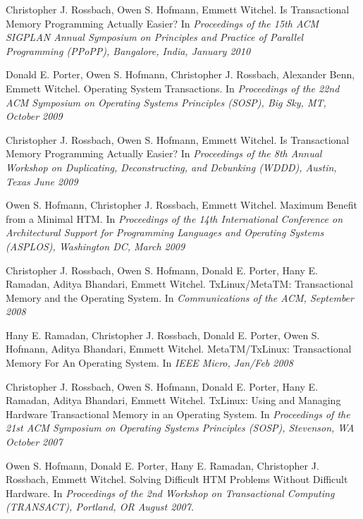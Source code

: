 \begin{bibsection}
\item Christopher J. Rossbach, Owen S. Hofmann, Emmett Witchel.
Is Transactional Memory Programming Actually Easier?
In \emph{Proceedings of the  15th ACM SIGPLAN Annual Symposium on
Principles and Practice of Parallel Programming (PPoPP), Bangalore, India,
January 2010} 
 
\item Donald E. Porter, Owen S. Hofmann, Christopher J. Rossbach, Alexander
Benn, Emmett Witchel.
Operating System Transactions.
In \emph{Proceedings of the 22nd ACM Symposium on Operating Systems
Principles (SOSP), Big Sky, MT, October 2009} 
 
\item Christopher J. Rossbach, Owen S. Hofmann, Emmett Witchel.
Is Transactional Memory Programming Actually Easier?
In \emph{Proceedings of the  8th Annual Workshop on Duplicating,
Deconstructing, and Debunking (WDDD), Austin, Texas June 2009} 
 
\item Owen S. Hofmann, Christopher J. Rossbach, Emmett Witchel.
Maximum Benefit from a Minimal HTM.
In \emph{Proceedings of the 14th International Conference on Architectural
Support for Programming Languages and Operating Systems (ASPLOS),
Washington DC, March 2009} 
 
\item Christopher J. Rossbach, Owen S. Hofmann, Donald E. Porter, Hany E.
Ramadan, Aditya Bhandari, Emmett Witchel.
TxLinux/MetaTM: Transactional Memory and the Operating System.
In \emph{Communications of the ACM, September 2008} 
 
\item Hany E. Ramadan, Christopher J. Rossbach, Donald E. Porter, Owen S.
Hofmann, Aditya Bhandari, Emmett Witchel.
MetaTM/TxLinux: Transactional Memory For An Operating System.
 In \emph{IEEE Micro, Jan/Feb 2008}
 
\item Christopher J. Rossbach, Owen S. Hofmann, Donald E. Porter, Hany E.
Ramadan, Aditya Bhandari, Emmett Witchel.
TxLinux: Using and Managing Hardware Transactional Memory in an
Operating System.
In \emph{Proceedings of the 21st ACM Symposium on Operating Systems
Principles (SOSP), Stevenson, WA October 2007} 
 
\item Owen S. Hofmann, Donald E. Porter, Hany E. Ramadan, Christopher J.
Rossbach, Emmett Witchel.
Solving Difficult HTM Problems Without Difficult Hardware.
In \emph{Proceedings of the 2nd Workshop on Transactional Computing
(TRANSACT), Portland, OR August 2007.} 
 

\end{bibsection}
